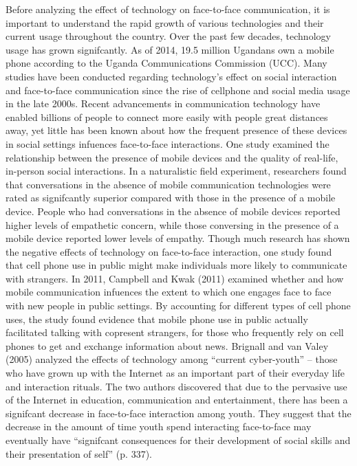 \documentclass[11pt]{article} %
\begin{document}
Before analyzing the effect of technology on face-to-face communication, it is important to understand the rapid growth of various technologies and their current usage throughout the country. Over the past few decades, technology usage has grown signifcantly. As of 2014, 19.5 million Ugandans own a mobile phone according to the Uganda Communications Commission (UCC).
\newline Many studies have been conducted regarding technology’s effect on social interaction and face-to-face communication since the rise of cellphone and social media usage in the late 2000s.
Recent advancements in communication technology have enabled billions of people to connect more easily with people great distances away, yet little has been known about how the frequent presence of these devices in social settings infuences face-to-face interactions.
\newline One study examined the relationship between the presence of mobile devices and the quality of real-life, in-person social interactions. In a naturalistic field experiment, researchers found that conversations in the absence of mobile communication technologies were rated as signifcantly superior compared with those in the presence of a mobile device. People who had conversations in the absence of mobile devices reported higher levels of empathetic concern, while those conversing in the presence of a mobile device reported lower levels of empathy. 
\newline Though much research has shown the negative effects of technology on face-to-face interaction, one study found that cell phone use in public might make individuals more likely to communicate with strangers. 
In 2011, Campbell and Kwak (2011) examined whether and how mobile communication infuences the extent to which one engages face to face with new people in public settings. By accounting for different types of cell phone uses, the study found evidence that mobile phone use in public actually facilitated talking with copresent strangers, for those who frequently rely on cell phones to get and exchange information about news.
\newline Brignall and van Valey (2005) analyzed the effects of technology among “current cyber-youth” – those who have grown up with the Internet as an important part of their everyday life and interaction rituals. The two authors discovered that due to the pervasive use of the Internet in education, communication and entertainment, there has been a signifcant decrease in face-to-face interaction among youth. They suggest that the decrease in the amount of time youth spend interacting face-to-face may eventually have “signifcant consequences for their development of social skills and their presentation of self” (p. 337). 
\end{document}
